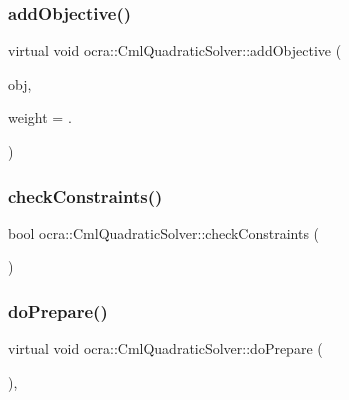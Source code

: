 \hypertarget{classocra_1_1CmlQuadraticSolver_a531381b1498b0ad4e460e5a2a75da9b4}{}\label{classocra_1_1CmlQuadraticSolver_a531381b1498b0ad4e460e5a2a75da9b4} 
\subsubsection{\texorpdfstring{add\+Objective()}{addObjective()}}
{\footnotesize\ttfamily virtual void ocra\+::\+Cml\+Quadratic\+Solver\+::add\+Objective (\begin{DoxyParamCaption}\item[{\hyperlink{classocra_1_1QuadraticFunction}{Quadratic\+Function} $\ast$}]{obj,  }\item[{\hyperlink{namespaceocra_af4478308ca113669e67d72f9a3050469}{real}}]{weight = {.} }\end{DoxyParamCaption})\hspace{0.3cm}{\ttfamily [virtual]}}

\hypertarget{classocra_1_1CmlQuadraticSolver_a8077e7d9f2017f0f176324bb04cb5cd1}{}\label{classocra_1_1CmlQuadraticSolver_a8077e7d9f2017f0f176324bb04cb5cd1} 
\subsubsection{\texorpdfstring{check\+Constraints()}{checkConstraints()}}
{\footnotesize\ttfamily bool ocra\+::\+Cml\+Quadratic\+Solver\+::check\+Constraints (\begin{DoxyParamCaption}\item[{void}]{ }\end{DoxyParamCaption})}

\hypertarget{classocra_1_1CmlQuadraticSolver_a6139c2cd572e403badc0451bf0ea9d90}{}\label{classocra_1_1CmlQuadraticSolver_a6139c2cd572e403badc0451bf0ea9d90} 
\subsubsection{\texorpdfstring{do\+Prepare()}{doPrepare()}}
{\footnotesize\ttfamily virtual void ocra\+::\+Cml\+Quadratic\+Solver\+::do\+Prepare (\begin{DoxyParamCaption}\item[{void}]{ }\end{DoxyParamCaption})\hspace{0.3cm}{\ttfamily [protected]}, {\ttfamily [virtual]}}



